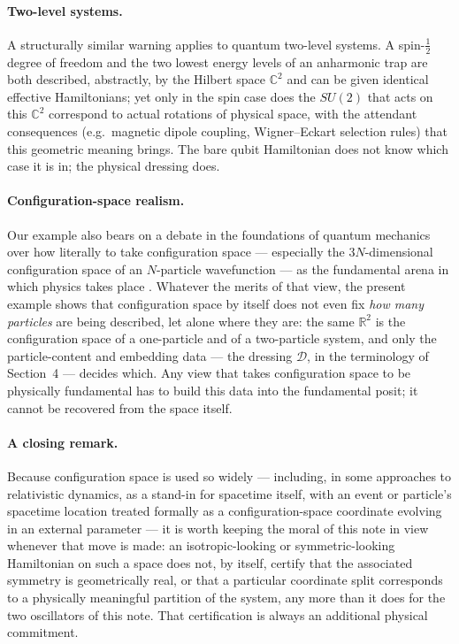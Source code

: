 \documentclass[11pt]{article}
\begin{document}
\paragraph{Two-level systems.} A structurally similar warning applies to quantum two-level systems. A spin-$\tfrac12$ degree of freedom and the two lowest energy levels of an anharmonic trap are both described, abstractly, by the Hilbert space $\mathbb{C}^2$ and can be given identical effective Hamiltonians; yet only in the spin case does the $SU(2)$ that acts on this $\mathbb{C}^2$ correspond to actual rotations of physical space, with the attendant consequences (e.g.\ magnetic dipole coupling, Wigner--Eckart selection rules) that this geometric meaning brings. The bare qubit Hamiltonian does not know which case it is in; the physical dressing does.

\paragraph{Configuration-space realism.} Our example also bears on a debate in the foundations of quantum mechanics over how literally to take configuration space --- especially the $3N$-dimensional configuration space of an $N$-particle wavefunction --- as the fundamental arena in which physics takes place \cite{Albert1996,Lewis2004,Monton2006}. Whatever the merits of that view, the present example shows that configuration space by itself does not even fix \emph{how many particles} are being described, let alone where they are: the same $\mathbb{R}^2$ is the configuration space of a one-particle and of a two-particle system, and only the particle-content and embedding data --- the dressing $\mathcal{D}$, in the terminology of Section~4 --- decides which. Any view that takes configuration space to be physically fundamental has to build this data into the fundamental posit; it cannot be recovered from the space itself.

\paragraph{A closing remark.} Because configuration space is used so widely --- including, in some approaches to relativistic dynamics, as a stand-in for spacetime itself, with an event or particle's spacetime location treated formally as a configuration-space coordinate evolving in an external parameter --- it is worth keeping the moral of this note in view whenever that move is made: an isotropic-looking or symmetric-looking Hamiltonian on such a space does not, by itself, certify that the associated symmetry is geometrically real, or that a particular coordinate split corresponds to a physically meaningful partition of the system, any more than it does for the two oscillators of this note. That certification is always an additional physical commitment.
\end{document}
